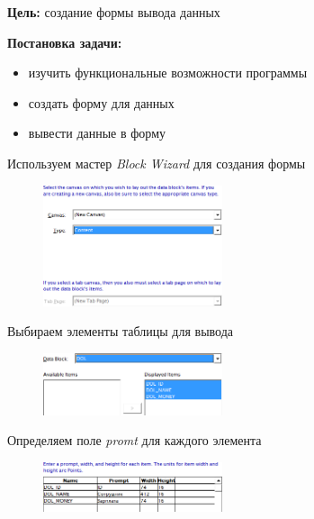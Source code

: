 \documentclass[pscyr, 12pt]{hedlab}
\begin{document}
    \makeheader
    \noindent\textbf{Цель:} создание формы вывода данных

    \noindent\textbf{Постановка задачи:}
    \vspace*{-1em}
    \begin{itemize}\itemsep-5pt
        \item изучить функциональные возможности программы
        \item создать форму для данных
        \item вывести данные в форму
    \end{itemize}

    Используем мастер \emph{Block Wizard} для создания формы
    \begin{figure}[ht!]
        \center
        \includegraphics[width=0.47\textwidth]{lab05_01}
    \end{figure}

    Выбираем элементы таблицы для вывода
    \begin{figure}[ht!]
        \center
        \includegraphics[width=0.47\textwidth]{lab05_02}
    \end{figure}

    Определяем поле \emph{promt} для каждого элемента
    \begin{figure}[ht!]
        \center
        \includegraphics[width=0.47\textwidth]{lab05_03}
    \end{figure}

    \pagebreak
\end{document}
